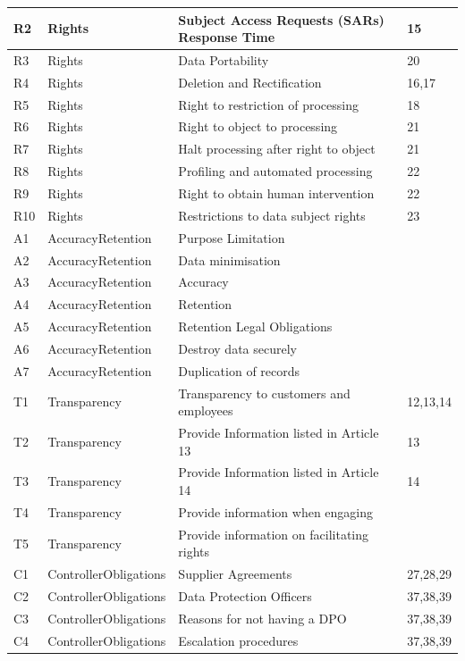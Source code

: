 \begin{table}[htbp]
\begin{tabularx}{\textwidth}{|l|l|X|l|}
R2 & Rights & Subject Access Requests (SARs) Response Time & 15 \\ \hline
R3 & Rights & Data Portability & 20 \\ \hline
R4 & Rights & Deletion and Rectification & 16,17 \\ \hline
R5 & Rights & Right to restriction of processing & 18 \\ \hline
R6 & Rights & Right to object to processing & 21 \\ \hline
R7 & Rights & Halt processing after right to object & 21 \\ \hline
R8 & Rights & Profiling and automated processing & 22 \\ \hline
R9 & Rights & Right to obtain human intervention & 22 \\ \hline
R10 & Rights & Restrictions to data subject rights & 23 \\ \hline
A1 & AccuracyRetention & Purpose Limitation &  \\ \hline
A2 & AccuracyRetention & Data minimisation &  \\ \hline
A3 & AccuracyRetention & Accuracy &  \\ \hline
A4 & AccuracyRetention & Retention &  \\ \hline
A5 & AccuracyRetention & Retention Legal Obligations &  \\ \hline
A6 & AccuracyRetention & Destroy data securely &  \\ \hline
A7 & AccuracyRetention & Duplication of records &  \\ \hline
T1 & Transparency & Transparency to customers and employees & 12,13,14 \\ \hline
T2 & Transparency & Provide Information listed in Article 13 & 13 \\ \hline
T3 & Transparency & Provide Information listed in Article 14 & 14 \\ \hline
T4 & Transparency & Provide information when engaging &  \\ \hline
T5 & Transparency & Provide information on facilitating rights &  \\ \hline
C1 & ControllerObligations & Supplier Agreements & 27,28,29 \\ \hline
C2 & ControllerObligations & Data Protection Officers & 37,38,39 \\ \hline
C3 & ControllerObligations & Reasons for not having a DPO & 37,38,39 \\ \hline
C4 & ControllerObligations & Escalation procedures & 37,38,39 \\ \hline

\end{tabularx}
\end{table}

